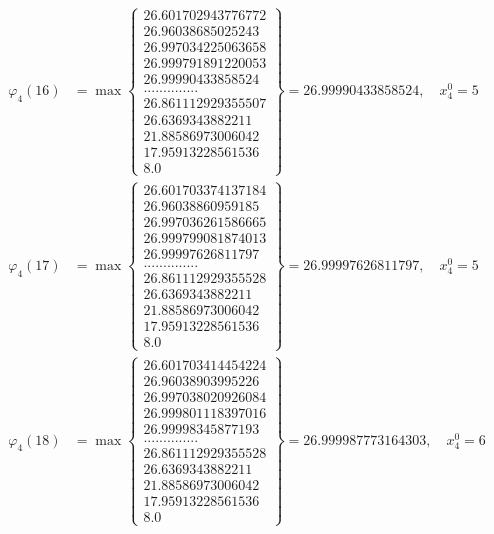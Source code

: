 \documentclass{article}
\begin{document}
\begin{align*}
  
  
  
\varphi_{4}(16) &= \max \left\{ \begin{array}{c}
26.601702943776772 \\
 26.96038685025243 \\
 26.997034225063658 \\
 26.999791891220053 \\
 26.99990433858524 \\
 .............. \\
 26.861112929355507 \\
 26.6369343882211 \\
 21.88586973006042 \\
 17.95913228561536 \\
 8.0
\end{array} \right\} = 26.99990433858524, \quad x_{4}^0 = 5\\
  
  
  
  
\varphi_{4}(17) &= \max \left\{ \begin{array}{c}
26.601703374137184 \\
 26.96038860959185 \\
 26.997036261586665 \\
 26.999799081874013 \\
 26.99997626811797 \\
 .............. \\
 26.861112929355528 \\
 26.6369343882211 \\
 21.88586973006042 \\
 17.95913228561536 \\
 8.0
\end{array} \right\} = 26.99997626811797, \quad x_{4}^0 = 5\\
  
  
  
  
\varphi_{4}(18) &= \max \left\{ \begin{array}{c}
26.601703414454224 \\
 26.96038903995226 \\
 26.997038020926084 \\
 26.999801118397016 \\
 26.99998345877193 \\
 .............. \\
 26.861112929355528 \\
 26.6369343882211 \\
 21.88586973006042 \\
 17.95913228561536 \\
 8.0
\end{array} \right\} = 26.999987773164303, \quad x_{4}^0 = 6\\
  

\end{align*}
\end{document}
